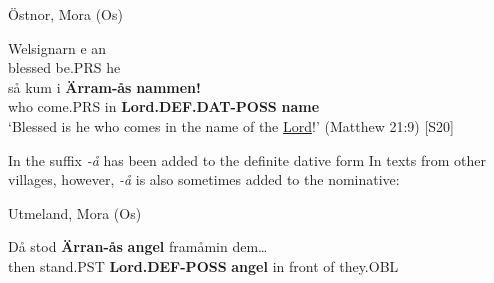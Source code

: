 
\item 

Östnor, Mora (Os)



 \ea\label{}
\gll Welsignarn  e  an\\


blessed  be.PRS  he\\

 \ea\label{}
\gll så  kum  i  \textbf{Ärram-ås} \textbf{nammen!}\\


who  come.PRS  in  \textbf{Lord.DEF.DAT-POSS} \textbf{name}\\

\glt ‘Blessed is he who comes in the name of the \href{http://www.godrules.net/library/topics/topic1192.htm}{Lord}!’ (Matthew 21:9) [S20]

\z

In  the suffix\textit{ {}-å} has been added to the definite dative form In texts from other villages, however,\textit{ {}-å} is also sometimes added to the nominative:


\item 

Utmeland, Mora (Os)



 \ea\label{}
\gll Då  stod  \textbf{Ärran-ås}\textbf{  angel} framåmin  dem…\\


then  stand.PST  \textbf{Lord.DEF-POSS} \textbf{angel} in front of  they.OBL\\

